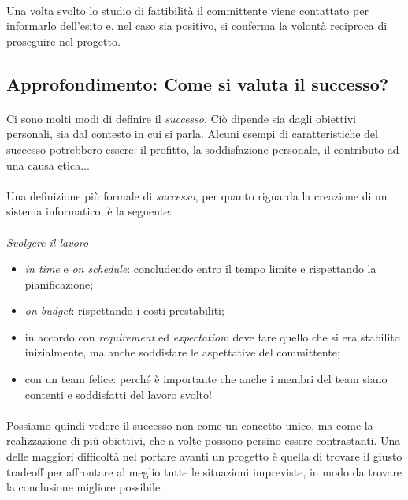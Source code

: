 \documentclass[12pt,a4paper,twoside,english,italian]{book}
\begin{document}
\paragraph{} Una volta svolto lo studio di fattibilità il committente viene contattato per informarlo dell'esito e, nel caso sia positivo, si conferma la volontà reciproca di proseguire nel progetto.


\subsection{Approfondimento: Come si valuta il successo?}

\paragraph{} Ci sono molti modi di definire il \emph{successo}. Ciò dipende sia dagli obiettivi personali, sia dal contesto in cui si parla. Alcuni esempi di caratteristiche del successo potrebbero essere: il profitto, la soddisfazione personale, il contributo ad una causa etica...

\paragraph{} Una definizione più formale di \emph{successo}, per quanto riguarda la creazione di un sistema informatico, è la seguente:

\paragraph{}
\emph{Svolgere il lavoro}
\begin{itemize}
    \item \emph{in time} e \emph{on schedule}: concludendo entro il tempo limite e rispettando la pianificazione;
    \item \emph{on budget}: rispettando i costi prestabiliti;
    \item in accordo con \emph{requirement} ed \emph{expectation}: deve fare quello che si era stabilito inizialmente, ma anche soddisfare le aspettative del committente;
    \item con un team felice: perché è importante che anche i membri del team siano contenti e soddisfatti del lavoro svolto! 
\end{itemize}

\paragraph{} Possiamo quindi vedere il successo non come un concetto unico, ma come la realizzazione di più obiettivi, che a volte possono persino essere contrastanti. Una delle maggiori difficoltà nel portare avanti un progetto è quella di trovare il giusto tradeoff per affrontare al meglio tutte le situazioni impreviste, in modo da trovare la conclusione migliore possibile. 
\end{document}
